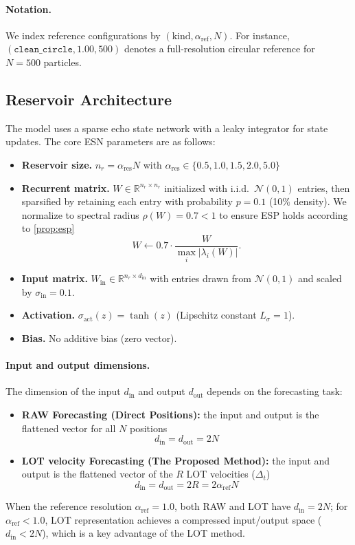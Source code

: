 \documentclass[11pt]{article}
\newcommand{\R}{\mathbb{R}}
\newcommand{\1}{\mathbf{1}}
\begin{document}
\paragraph{Notation.}
We index reference configurations by $(\text{kind}, \alpha_{\text{ref}}, N)$. For instance, $(\texttt{clean\_circle}, 1.00, 500)$ denotes a full-resolution circular reference for $N = 500$ particles.

\subsection{Reservoir Architecture}\label{sec:rc-arch}

The model uses a sparse echo state network with a leaky integrator for state updates. The core ESN parameters are as follows: 
\begin{itemize}
\item \textbf{Reservoir size.} $n_r = \alpha_{\text{res}} N$ with $\alpha_{\text{res}} \in \{0.5, 1.0, 1.5, 2.0, 5.0\}$

\item \textbf{Recurrent matrix.} $W \in \R^{n_r \times n_r}$ initialized with i.i.d.\ $\mathcal{N}(0,1)$ entries, then sparsified by retaining each entry with probability $p = 0.1$ (10\% density). We normalize to spectral radius $\rho(W) = 0.7 < 1$ to ensure ESP holds according to \ref{prop:esp}
\begin{equation}
W \leftarrow 0.7 \cdot \frac{W}{\max_i |\lambda_i(W)|}.
\end{equation}

\item \textbf{Input matrix.} $W_{\text{in}} \in \R^{n_r \times d_{\text{in}}}$ with entries drawn from $\mathcal{N}(0,1)$ and scaled by $\sigma_{\text{in}} = 0.1$.

\item \textbf{Activation.} $\sigma_{\mathrm{act}}(z) = \tanh(z)$ (Lipschitz constant $L_\sigma = 1$).

\item \textbf{Bias.} No additive bias (zero vector).
\end{itemize}

\paragraph{Input and output dimensions.} The dimension of the input $d_{\text{in}}$ and output $d_{\text{out}}$ depends on the forecasting task:
\begin{itemize}
\item \textbf{RAW Forecasting (Direct Positions):} the input and output is the flattened vector for all $N$ positions
\[
d_{\text{in}} = d_{\text{out}} = 2N
\]
\item \textbf{LOT velocity Forecasting (The Proposed Method):} the input and output is the flattened vector of the $R$ LOT velocities ($\Delta_t$)
\[
d_{\text{in}} = d_{\text{out}} = 2R = 2\alpha_{\text{ref}} N
\]
\end{itemize}
When the reference resolution $\alpha_{\text{ref}} = 1.0$, both RAW and LOT have $d_{\text{in}} = 2N$; for $\alpha_{\text{ref}} < 1.0$, LOT representation achieves a compressed input/output space ($d_{\text{in}} < 2N$), which is a key advantage of the LOT method.
\end{document}
